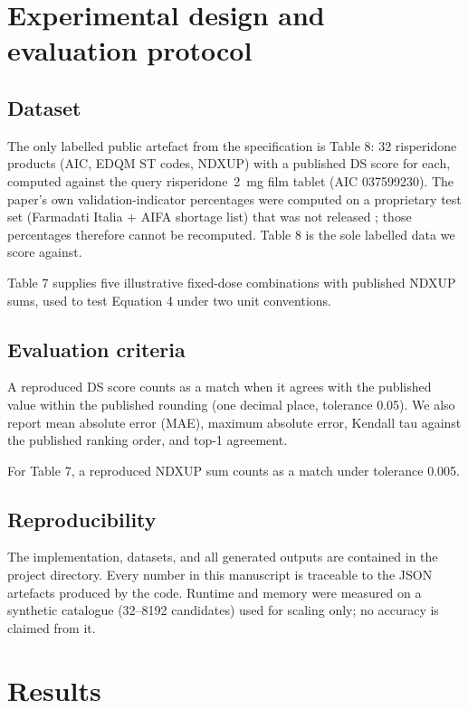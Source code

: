 \documentclass[a4paper]{elsarticle}
\begin{document}
\section{Experimental design and evaluation protocol}
\label{sec:experiment}

\subsection{Dataset}
\label{sec:data}

The only labelled public artefact from the specification is Table 8: 32 risperidone products (AIC, EDQM ST codes, NDXUP) with a published DS score for each, computed against the query risperidone~2~mg film tablet (AIC 037599230). The paper's own validation-indicator percentages were computed on a proprietary test set (Farmadati Italia + AIFA shortage list) that was not released \citep{caviglioli2025medicine}; those percentages therefore cannot be recomputed. Table 8 is the sole labelled data we score against.

Table 7 supplies five illustrative fixed-dose combinations with published NDXUP sums, used to test Equation 4 under two unit conventions.

\subsection{Evaluation criteria}
\label{sec:criteria}

A reproduced DS score counts as a match when it agrees with the published value within the published rounding (one decimal place, tolerance 0.05). We also report mean absolute error (MAE), maximum absolute error, Kendall tau against the published ranking order, and top-1 agreement.

For Table 7, a reproduced NDXUP sum counts as a match under tolerance 0.005.

\subsection{Reproducibility}
\label{sec:repro}

The implementation, datasets, and all generated outputs are contained in the project directory. Every number in this manuscript is traceable to the JSON artefacts produced by the code. Runtime and memory were measured on a synthetic catalogue (32--8192 candidates) used for scaling only; no accuracy is claimed from it.

\section{Results}
\label{sec:results}
\end{document}
